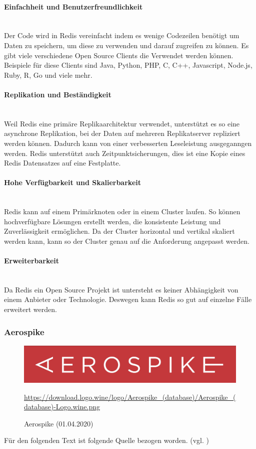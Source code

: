 \paragraph{Einfachheit und Benutzerfreundlichkeit}\mbox{} \\
Der Code wird in Redis vereinfacht indem es wenige Codezeilen benötigt um Daten zu speichern, um diese zu verwenden und darauf zugreifen zu können. Es gibt viele verschiedene Open Source Clients die Verwendet werden können. Beispiele für diese Clients sind Java, Python, PHP, C, C++, Javascript, Node.js, Ruby, R, Go und viele mehr.
\paragraph{Replikation und Beständigkeit}\mbox{} \\
Weil Redis eine primäre Replikaarchitektur verwendet, unterstützt es so eine asynchrone Replikation, bei der Daten auf mehreren Replikatserver repliziert werden können. Dadurch kann von einer verbesserten Leseleistung ausgeganngen werden. Redis unterstützt auch Zeitpunktsicherungen, dies ist eine Kopie eines Redis Datensatzes auf eine Festplatte.  
\paragraph{Hohe Verfügbarkeit und Skalierbarkeit}\mbox{} \\
Redis kann auf einem Primärknoten oder in einem Cluster laufen. So können hochverfügbare Lösungen erstellt werden, die konsistente Leistung und Zuverlässigkeit ermöglichen. Da der Cluster horizontal und vertikal skaliert werden kann, kann so der Cluster genau auf die Anforderung angepasst werden.
\paragraph{Erweiterbarkeit}\mbox{} \\
Da Redis ein Open Source Projekt ist untersteht es keiner Abhängigkeit von einem Anbieter oder Technologie. Deswegen kann Redis so gut auf einzelne Fälle erweitert werden.

\subsubsection{Aerospike}
\begin{figure}[H]
\centering
  \includegraphics[scale=0.2]{images/Aerospike.png}
  \caption[Aerospike (01.04.2020)]{Aerospike (01.04.2020)}
  \label{fig:Aerospike}
  \url{https://download.logo.wine/logo/Aerospike_(database)/Aerospike_(database)-Logo.wine.png}
\end{figure}
Für den folgenden Text ist folgende Quelle bezogen worden. (vgl. \cite{computer_funktionen_2020})

